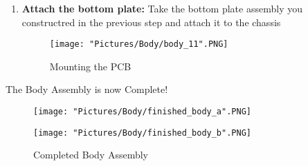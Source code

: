 \documentclass[12pt]{article}
\begin{document}
\begin{enumerate}
\item \textbf{Attach the bottom plate:} Take the bottom plate assembly you constructred in the previous step and attach it to the chassis

\begin{figure}[H]
	\centering
	\texttt{[image: "Pictures/Body/body\_11".PNG]}
	\caption{Mounting the PCB}
\end{figure}

\end{enumerate}

The Body Assembly is now Complete!

\begin{figure}[H]
  \centering
  \begin{minipage}[b]{0.45\textwidth}
    \texttt{[image: "Pictures/Body/finished\_body\_a".PNG]}
  \end{minipage}
  \hfill
  \begin{minipage}[b]{0.45\textwidth}
    \texttt{[image: "Pictures/Body/finished\_body\_b".PNG]}
  \end{minipage}
  \caption{Completed Body Assembly}
\end{figure}
\end{document}

